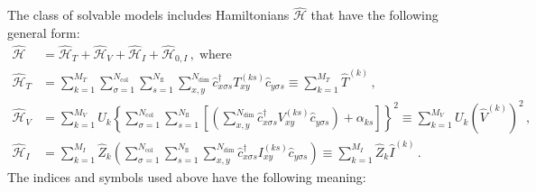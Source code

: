 The class of solvable models includes  Hamiltonians $\hat{\mathcal{H}}$ that have the following general form:
\begin{align}
\hat{\mathcal{H}}
&=
\hat{\mathcal{H}}_{T}+\hat{\mathcal{H}}_{V} +  \hat{\mathcal{H}}_{I} +   \hat{\mathcal{H}}_{0,I}\,,\;\text{where}
\label{eqn:general_ham}\\
\hat{\mathcal{H}}_{T}
&=
\sum\limits_{k=1}^{M_T}
\sum\limits_{\sigma=1}^{N_{\mathrm{col}}}
\sum\limits_{s=1}^{N_{\mathrm{fl}}}
\sum\limits_{x,y}^{N_{\mathrm{dim}}}
\hat{c}^{\dagger}_{x \sigma   s}T_{xy}^{(k s)} \hat{c}^{\phantom\dagger}_{y \sigma s}  \equiv  \sum\limits_{k=1}^{M_T} \hat{T}^{(k)}
\label{eqn:general_ham_t}\,,\\
\hat{\mathcal{H}}_{V}
&=
\sum\limits_{k=1}^{M_V}U_{k}
\left\{
\sum\limits_{\sigma=1}^{N_{\mathrm{col}}}
\sum\limits_{s=1}^{N_{\mathrm{fl}}}
\left[
\left(
\sum\limits_{x,y}^{N_{\mathrm{dim}}}
\hat{c}^{\dagger}_{x \sigma s}V_{xy}^{(k s)}\hat{c}^{\phantom\dagger}_{y \sigma s}
\right)
+\alpha_{k s} 
\right]
\right\}^{2}  \equiv   
\sum\limits_{k=1}^{M_V}U_{k}   \left(\hat{V}^{(k)} \right)^2
\label{eqn:general_ham_v}\,,\\
\hat{\mathcal{H}}_{I}
& = 
\sum\limits_{k=1}^{M_I} \hat{Z}_{k} 
\left(
\sum\limits_{\sigma=1}^{N_{\mathrm{col}}}
\sum\limits_{s=1}^{N_{\mathrm{fl}}}
\sum\limits_{x,y}^{N_{\mathrm{dim}}}
\hat{c}^{\dagger}_{x \sigma s} I_{xy}^{(k s)}\hat{c}^{\phantom\dagger}_{y \sigma s}
\right) \equiv \sum\limits_{k=1}^{M_I} \hat{Z}_{k}    \hat{I}^{(k)} 
\,.\label{eqn:general_ham_i}
\end{align}
The indices and symbols used above have the following meaning:
